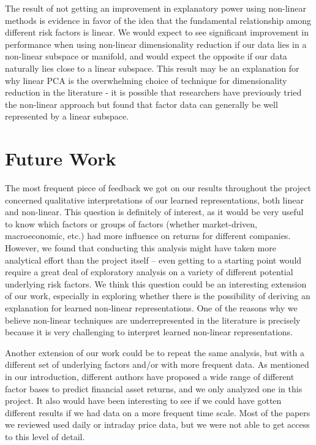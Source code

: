 \documentclass[a4paper]{article}
\begin{document}
    \par The result of not getting an improvement in explanatory power using non-linear methods is evidence in favor of the idea that the fundamental relationship among different risk factors is linear. We would expect to see significant improvement in performance when using non-linear dimensionality reduction if our data lies in a non-linear subspace or manifold, and would expect the opposite if our data naturally lies close to a linear subspace. This result may be an explanation for why linear PCA is the overwhelming choice of technique for dimensionality reduction in the literature - it is possible that researchers have previously tried the non-linear approach but found that factor data can generally be well represented by a linear subspace.
    
    \section{Future Work}
    \par The most frequent piece of feedback we got on our results throughout the project concerned qualitative interpretations of our learned representations, both linear and non-linear. This question is definitely of interest, as it would be very useful to know which factors or groups of factors (whether market-driven, macroeconomic, etc.) had more influence on returns for different companies. However, we found that conducting this analysis might have taken more analytical effort than the project itself – even getting to a starting point would require a great deal of exploratory analysis on a variety of different potential underlying risk factors. We think this question could be an interesting extension of our work, especially in exploring whether there is the possibility of deriving an explanation for learned non-linear representations. One of the reasons why we believe non-linear techniques are underrepresented in the literature is precisely because it is very challenging to interpret learned non-linear representations.
    \par Another extension of our work could be to repeat the same analysis, but with a different set of underlying factors and/or with more frequent data. As mentioned in our introduction, different authors have proposed a wide range of different factor bases to predict financial asset returns, and we only analyzed one in this project. It also would have been interesting to see if we could have gotten different results if we had data on a more frequent time scale. Most of the papers we reviewed used daily or intraday price data, but we were not able to get access to this level of detail.
    
\end{document}
